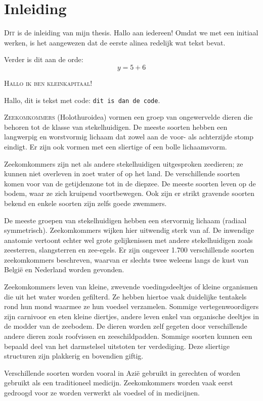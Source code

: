 \chapter{Inleiding}\label{ch:inleiding}

\lettrine{D}{it} is de inleiding van mijn thesis.
Hallo aan iedereen!
Omdat we met een initiaal werken, is het aangewezen dat de eerste alinea redelijk wat tekst bevat.


Verder is dit aan de orde:
\[
    y = 5 + 6
\]

\textsc{Hallo ik ben kleinkapitaal!}

Hallo, dit is tekst met code: \texttt{dit is dan de code}.

\lettrine{Z}{eekomkommers} (Holothuroidea) vormen een groep van ongewervelde dieren die behoren tot de klasse van stekelhuidigen.
De meeste soorten hebben een langwerpig en worstvormig lichaam dat zowel aan de voor- als achterzijde stomp eindigt.
Er zijn ook vormen met een sliertige of een bolle lichaamsvorm.

Zeekomkommers zijn net als andere stekelhuidigen uitgesproken zeedieren;
ze kunnen niet overleven in zoet water of op het land.
De verschillende soorten komen voor van de getijdenzone tot in de diepzee.
De meeste soorten leven op de bodem, waar ze zich kruipend voortbewegen.
Ook zijn er strikt gravende soorten bekend en enkele soorten zijn zelfs goede zwemmers.

De meeste groepen van stekelhuidigen hebben een stervormig lichaam (radiaal symmetrisch).
Zeekomkommers wijken hier uitwendig sterk van af.
De inwendige anatomie vertoont echter wel grote gelijkenissen met andere stekelhuidigen zoals zeesterren, slangsterren en zee-egels.
Er zijn ongeveer 1.700 verschillende soorten zeekomkommers beschreven, waarvan er slechts twee weleens langs de kust van België en Nederland worden gevonden.

Zeekomkommers leven van kleine, zwevende voedingsdeeltjes of kleine organismen die uit het water worden gefilterd.
Ze hebben hiertoe vaak duidelijke tentakels rond hun mond waarmee ze hun voedsel verzamelen.
Sommige vertegenwoordigers zijn carnivoor en eten kleine diertjes, andere leven enkel van organische deeltjes in de modder van de zeebodem.
De dieren worden zelf gegeten door verschillende andere dieren zoals roofvissen en zeeschildpadden.
Sommige soorten kunnen een bepaald deel van het darmstelsel uitstoten ter verdediging.
Deze sliertige structuren zijn plakkerig en bovendien giftig.

Verschillende soorten worden vooral in Azië gebruikt in gerechten of worden gebruikt als een traditioneel medicijn.
Zeekomkommers worden vaak eerst gedroogd voor ze worden verwerkt als voedsel of in medicijnen.

